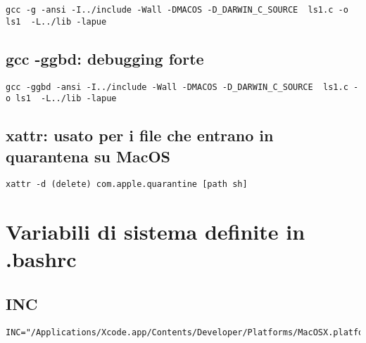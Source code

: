 \begin{lstlisting}
gcc -g -ansi -I../include -Wall -DMACOS -D_DARWIN_C_SOURCE  ls1.c -o ls1  -L../lib -lapue
\end{lstlisting}


\subsection{gcc -ggbd: debugging forte}

\begin{lstlisting}
gcc -ggbd -ansi -I../include -Wall -DMACOS -D_DARWIN_C_SOURCE  ls1.c -o ls1  -L../lib -lapue
\end{lstlisting}


\subsection{xattr: usato per i file che entrano in quarantena su MacOS}

\begin{lstlisting}
xattr -d (delete) com.apple.quarantine [path sh]
\end{lstlisting}





\section{Variabili di sistema definite in .bashrc}

\subsection{INC}

\begin{lstlisting}
INC="/Applications/Xcode.app/Contents/Developer/Platforms/MacOSX.platform/Developer/SDKs/MacOSX.sdk/usr/include/"
\end{lstlisting}